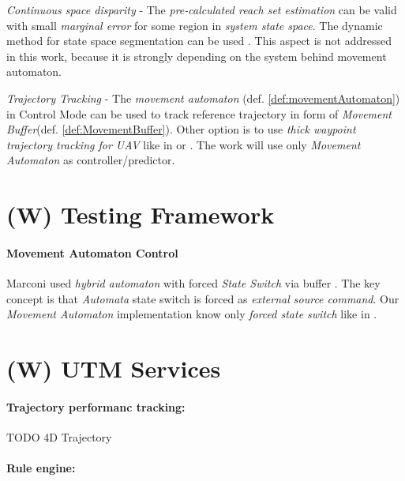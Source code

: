 \emph{Continuous space disparity} - The \emph{pre-calculated reach set estimation} can be valid with small \emph{marginal error} for some region in \emph{system state space}. The dynamic method for state space segmentation can be used \cite{takahashi1996reasonable}. This aspect is not addressed in this work, because it is strongly depending on the system behind movement automaton. 

\emph{Trajectory Tracking} - The \emph{movement automaton} (def. \ref{def:movementAutomaton}) in Control Mode can be used to track reference trajectory in form of \emph{Movement Buffer}(def. \ref{def:MovementBuffer}). Other option is to use \emph{thick waypoint trajectory tracking for UAV} like in \cite{kaminer1998trajectory} or \cite{murillo2015generalized}. The work will use only \emph{Movement Automaton} as controller/predictor. 




\section{(W) Testing Framework}\label{s:TestingFrameworkTheory}

\paragraph{Movement Automaton Control} Marconi used \emph{hybrid automaton} with forced \emph{State Switch} via buffer \cite{marconi2009control}. The key concept is that \emph{Automata} state switch is forced as \emph{external source command}. Our \emph{Movement Automaton} implementation know only \emph{forced state switch} like in \cite{frazzoli2000trajectory}. 

\section{(W) UTM Services}\label{s:utmServicesTheory}
\paragraph{Trajectory performanc tracking:} TODO 4D Trajectory \cite{gardi20154} 
\paragraph{Rule engine:}





	